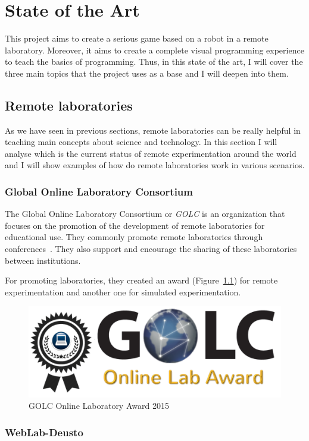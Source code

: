 \chapter{State of the Art}

This project aims to create a serious game based on a robot in a remote laboratory. Moreover, it
aims to create a complete visual programming experience to teach the basics of programming. Thus,
in this state of the art, I will cover the three main topics that the project uses as a base and I
will deepen into them.

\section{Remote laboratories}

As we have seen in previous sections, remote laboratories can be really helpful in teaching main
concepts about science and technology. In this section I will analyse which is the current status of
remote experimentation around the world and I will show examples of how do remote laboratories work
in various scenarios.

\subsection{Global Online Laboratory Consortium}

The Global Online Laboratory Consortium or \textit{GOLC} is an organization that focuses on
the promotion of the development of remote laboratories for educational use. They commonly promote
remote laboratories through conferences~\cite{golc1st}. They also support and encourage the sharing
of these laboratories between institutions.

For promoting laboratories, they created an award (Figure~\ref{fig:golc_award}) for remote
experimentation and another one for simulated experimentation.

\begin{figure}[!htbp]
	\centering
	\includegraphics[width=.4\textwidth]{fig/golc_award}
	\caption{GOLC Online Laboratory Award 2015}\label{fig:golc_award}
\end{figure}

\subsection{WebLab-Deusto}

